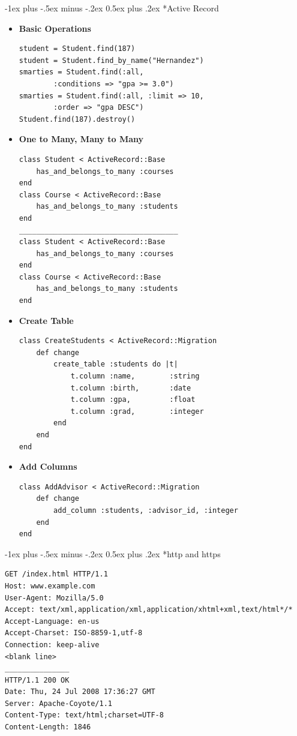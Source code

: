 \documentclass[10pt,landscape]{article}
\makeatletter
\renewcommand{\section}{\@startsection{section}{1}{0mm}%
                                {-1ex plus -.5ex minus -.2ex}%
                                {0.5ex plus .2ex}%
                                {\normalfont\large\bfseries}}
\makeatother
\begin{document}
\begin{multicols}{2}
\section*{Active Record}
\begin{itemize}
\item \textbf{Basic Operations}
\begin{verbatim}
student = Student.find(187)
student = Student.find_by_name("Hernandez")
smarties = Student.find(:all,
        :conditions => "gpa >= 3.0")
smarties = Student.find(:all, :limit => 10,
        :order => "gpa DESC")
Student.find(187).destroy()
\end{verbatim}
\item \textbf{One to Many, Many to Many  }
\begin{verbatim}
class Student < ActiveRecord::Base
    has_and_belongs_to_many :courses
end
class Course < ActiveRecord::Base
    has_and_belongs_to_many :students
end
_____________________________________
class Student < ActiveRecord::Base
    has_and_belongs_to_many :courses
end
class Course < ActiveRecord::Base
    has_and_belongs_to_many :students
end
\end{verbatim}
\item \textbf{Create Table}
\begin{verbatim}
class CreateStudents < ActiveRecord::Migration
    def change
        create_table :students do |t|
            t.column :name,        :string
            t.column :birth,       :date
            t.column :gpa,         :float
            t.column :grad,        :integer
        end
    end
end
\end{verbatim}
\item \textbf{Add Columns}
\begin{verbatim}
class AddAdvisor < ActiveRecord::Migration
    def change
        add_column :students, :advisor_id, :integer
    end
end
\end{verbatim}
\end{itemize}
\section*{http and https}
\begin{verbatim}
GET /index.html HTTP/1.1
Host: www.example.com
User-Agent: Mozilla/5.0
Accept: text/xml,application/xml,application/xhtml+xml,text/html*/*
Accept-Language: en-us
Accept-Charset: ISO-8859-1,utf-8
Connection: keep-alive
<blank line>
_______________
HTTP/1.1 200 OK
Date: Thu, 24 Jul 2008 17:36:27 GMT
Server: Apache-Coyote/1.1
Content-Type: text/html;charset=UTF-8
Content-Length: 1846


\end{verbatim}
\end{multicols}
\end{document}
